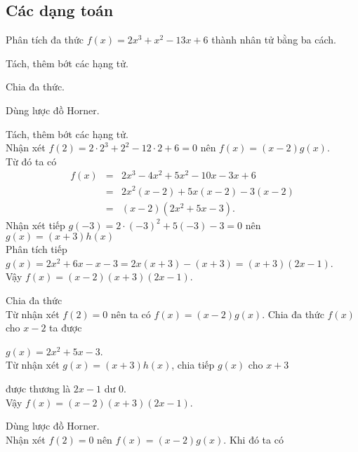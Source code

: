 \subsection{Các dạng toán}

\begin{dang}
\end{dang}

\begin{vd}
	Phân tích đa thức $ f(x)=2x^3+x^2-13x+6 $ thành nhân tử bằng ba cách.
	\begin{listEX}
		\item Tách, thêm bớt các hạng tử.
		\item Chia đa thức.
		\item Dùng lược đồ Horner.
	\end{listEX}
	\loigiai
	{
		\begin{listEX}
			\item Tách, thêm bớt các hạng tử.\\
			Nhận xét $f(2)=2\cdot 2^3+2^2-12\cdot 2+6=0$ nên $ f(x)=(x-2)g(x)$.\\
			Từ đó ta có 
			\begin{eqnarray*}
				f(x)&=&2x^3-4x^2+5x^2-10x-3x+6\\
				&=&2x^2(x-2)+5x(x-2)-3(x-2)\\
				&=&(x-2)(2x^2+5x-3).
			\end{eqnarray*}
			Nhận xét tiếp $ g(-3)=2\cdot (-3)^2+5(-3)-3=0$ nên $ g(x)=(x+3)h(x) $\\
			Phân tích tiếp $ g(x)=2x^2+6x-x-3=2x(x+3)-(x+3)=(x+3)(2x-1)$.\\
			Vậy $ f(x)=(x-2)(x+3)(2x-1)$.
			\item Chia đa thức\\
			Từ nhận xét $ f(2)=0 $ nên ta có $ f(x)=(x-2)g(x)$. Chia đa thức $ f(x)$ cho $x-2$ ta được
			\begin{center}
			\end{center}
			 $ g(x)=2x^2+5x-3$.\\
			Từ nhận xét $ g(x)=(x+3)h(x)$, chia tiếp $ g(x) $ cho $x+3$
			\begin{center}
			\end{center}
			 được thương là $ 2x-1 $ dư $ 0 $.\\
			Vậy $ f(x)=(x-2)(x+3)(2x-1)$. 
			\item Dùng lược đồ Horner.\\
			Nhận xét $ f(2)=0 $ nên $ f(x)=(x-2)g(x)$. Khi đó ta có

\end{listEX}}
\end{vd}
